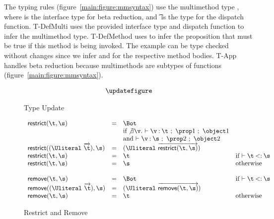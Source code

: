 The typing rules (figure~\ref{main:figure:mmsyntax}) use the multimethod type {\MultiFntype{\s{}}{\t{}}}, 
where \s{} is the interface type for beta reduction, and \t{} is the type for
the dispatch function. T-DefMulti uses the provided interface type and dispatch function
to infer the multimethod type. T-DefMethod uses \isacompareliteral{} to infer the proposition
that must be true if this method is being invoked. The example can be type checked without
changes since we infer \isprop{\Number}{\x{}} and \isprop{\Keyword}{\x{}} for the respective
method bodies. T-App handles beta reduction because multimethods are subtypes of functions
(figure~\ref{main:figure:mmsyntax}).



\begin{figure*}
  $$
\begin{array}{lllll}
\updatefigure
\end{array}
$$
\caption{Type Update}
\label{main:figure:update}
\end{figure*}

{}

\begin{figure}
  $$
\begin{array}{lllll}
  \restrictremovefigure{}
\end{array}
  $$
  \caption{Restrict and Remove}
  \label{main:figure:restrictremove}
\end{figure}
